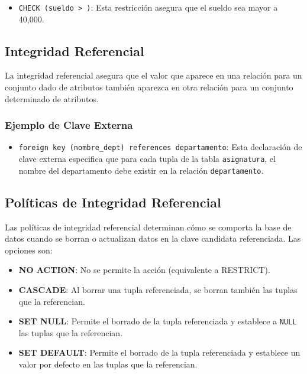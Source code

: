 \documentclass{article}
\begin{document}
\begin{itemize}
    \item \texttt{CHECK (sueldo > )}: Esta restricción asegura que el sueldo sea mayor a 40,000.
\end{itemize}

\newpage

\subsection{Integridad Referencial}

La integridad referencial asegura que el valor que aparece en una relación para un conjunto dado de atributos también aparezca en otra relación para un conjunto determinado de atributos.

\subsubsection{Ejemplo de Clave Externa}

\begin{itemize}
    \item \texttt{foreign key (nombre\_dept) references departamento}: Esta declaración de clave externa especifica que para cada tupla de la tabla \texttt{asignatura}, el nombre del departamento debe existir en la relación \texttt{departamento}.
\end{itemize}

\subsection{Políticas de Integridad Referencial}

Las políticas de integridad referencial determinan cómo se comporta la base de datos cuando se borran o actualizan datos en la clave candidata referenciada. Las opciones son:

\begin{itemize}
    \item \textbf{NO ACTION}: No se permite la acción (equivalente a RESTRICT).
    \item \textbf{CASCADE}: Al borrar una tupla referenciada, se borran también las tuplas que la referencian.
    \item \textbf{SET NULL}: Permite el borrado de la tupla referenciada y establece a \texttt{NULL} las tuplas que la referencian.
    \item \textbf{SET DEFAULT}: Permite el borrado de la tupla referenciada y establece un valor por defecto en las tuplas que la referencian.
\end{itemize}
\end{document}
